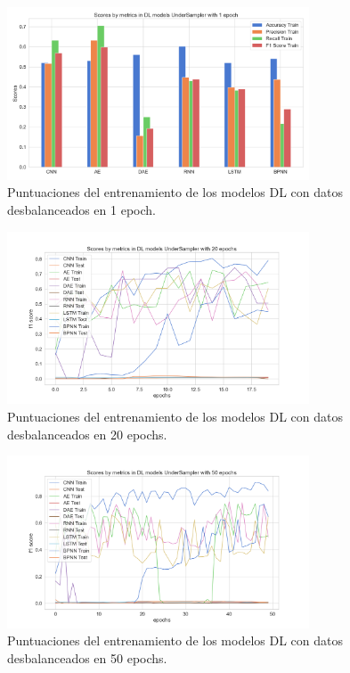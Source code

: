 \begin{figure}[h!]
	\centering
	\includegraphics[width=0.8\textwidth]{"figuras/Experimento5/UnderSampler/DL_UnderSampler_1_train"}
	\caption{Puntuaciones del entrenamiento de los modelos DL con datos desbalanceados en 1 epoch.}
	\label{an:11}
\end{figure}

\begin{figure}[h!]
	\centering
	\includegraphics[width=0.8\textwidth]{"figuras/Experimento5/UnderSampler/DL_UnderSampler_20_train"}
	\caption{Puntuaciones del entrenamiento de los modelos DL con datos desbalanceados en 20 epochs.}
	\label{an:12}
\end{figure}

\begin{figure}[h!]
	\centering
	\includegraphics[width=0.8\textwidth]{"figuras/Experimento5/UnderSampler/DL_UnderSampler_50_train"}
	\caption{Puntuaciones del entrenamiento de los modelos DL con datos desbalanceados en 50 epochs.}
	\label{an:13}
\end{figure}

